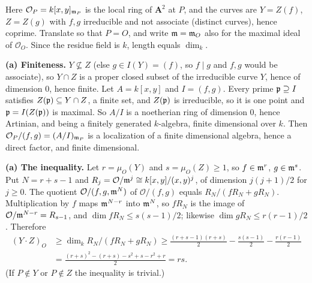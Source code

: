 \documentclass[11pt]{article}
\begin{document}
\pf
Here $\mathcal O_P=k[x,y]_{\mathfrak m_P}$ is the local ring of $\mathbf A^2$ at $P$, and the curves are $Y=Z(f)$, $Z=Z(g)$ with $f,g$ irreducible and not associate (distinct curves), hence coprime. Translate so that $P=O$, and write $\mathfrak m=\mathfrak m_O$ also for the maximal ideal of $\mathcal O_O$. Since the residue field is $k$, length equals $\dim_k$.

\textbf{(a) Finiteness.} $Y\not\subseteq Z$ (else $g\in I(Y)=(f)$, so $f\mid g$ and $f,g$ would be associate), so $Y\cap Z$ is a proper closed subset of the irreducible curve $Y$, hence of dimension $0$, hence finite. Let $A=k[x,y]$ and $I=(f,g)$. Every prime $\mathfrak p\supseteq I$ satisfies $Z(\mathfrak p)\subseteq Y\cap Z$, a finite set, and $Z(\mathfrak p)$ is irreducible, so it is one point and $\mathfrak p=I(Z(\mathfrak p))$ is maximal. So $A/I$ is a noetherian ring of dimension $0$, hence Artinian, and being a finitely generated $k$-algebra, finite dimensional over $k$. Then $\mathcal O_P/(f,g)=(A/I)_{\mathfrak m_P}$ is a localization of a finite dimensional algebra, hence a direct factor, and finite dimensional.

\textbf{(a) The inequality.} Let $r=\mu_O(Y)$ and $s=\mu_O(Z)\ge1$, so $f\in\mathfrak m^r$, $g\in\mathfrak m^s$. Put $N=r+s-1$ and $R_j=\mathcal O/\mathfrak m^j\cong k[x,y]/(x,y)^j$, of dimension $j(j+1)/2$ for $j\ge0$. The quotient $\mathcal O/(f,g,\mathfrak m^N)$ of $\mathcal O/(f,g)$ equals $R_N/(fR_N+gR_N)$. Multiplication by $f$ maps $\mathfrak m^{N-r}$ into $\mathfrak m^N$, so $fR_N$ is the image of $\mathcal O/\mathfrak m^{N-r}=R_{s-1}$, and $\dim fR_N\le s(s-1)/2$; likewise $\dim gR_N\le r(r-1)/2$. Therefore
\begin{align*}
(Y\cdot Z)_O&\ge\dim_k R_N/(fR_N+gR_N)\ge \frac{(r+s-1)(r+s)}2-\frac{s(s-1)}2-\frac{r(r-1)}2\\
&=\frac{(r+s)^2-(r+s)-s^2+s-r^2+r}{2}=rs.
\end{align*}
(If $P\notin Y$ or $P\notin Z$ the inequality is trivial.)
\end{document}
